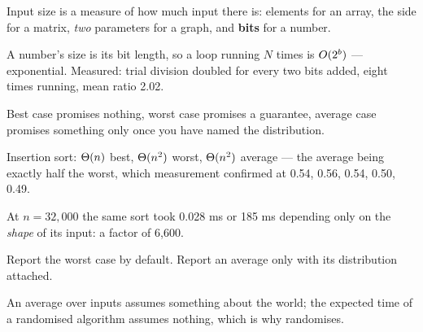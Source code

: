 \begin{chaptersummary}
\begin{tight}
  \item Input size is a measure of how much input there is: elements for an
        array, the side for a matrix, \emph{two} parameters for a graph, and
        \textbf{bits} for a number.
  \item A number's size is its bit length, so a loop running $N$ times is
        $O(2^{b})$ --- exponential. Measured: trial division doubled for
        every two bits added, eight times running, mean ratio 2.02.
  \item Best case promises nothing, worst case promises a guarantee, average
        case promises something only once you have named the distribution.
  \item Insertion sort: $\Theta(n)$ best, $\Theta(n^{2})$ worst, $\Theta(n^{2})$
        average --- the average being exactly half the worst, which measurement
        confirmed at 0.54, 0.56, 0.54, 0.50, 0.49.
  \item At $n = 32{,}000$ the same sort took 0.028 ms or 185 ms depending only
        on the \emph{shape} of its input: a factor of 6{,}600.
  \item Report the worst case by default. Report an average only with its
        distribution attached.
  \item An average over inputs assumes something about the world; the expected
        time of a randomised algorithm assumes nothing, which is why
         randomises.
\end{tight}
\end{chaptersummary}

